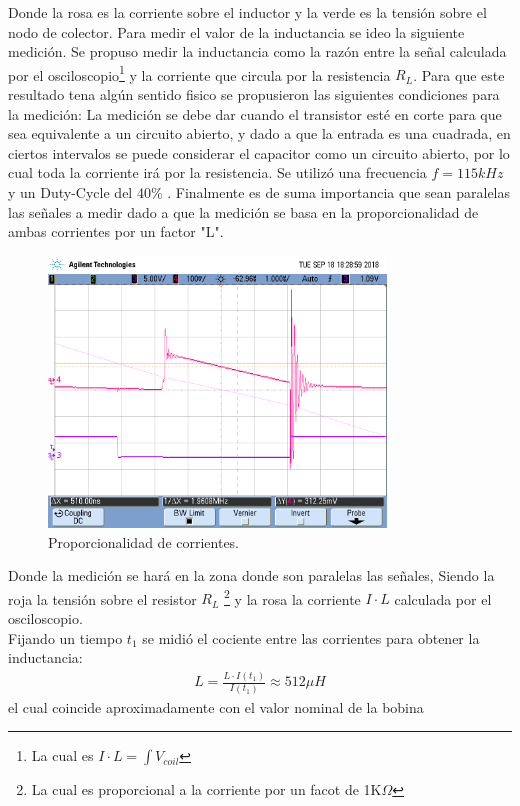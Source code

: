 Donde la rosa es la corriente sobre el inductor y la verde es la tensión sobre el nodo de colector.
Para medir el valor de la inductancia se ideo la siguiente medición.
Se  propuso medir la inductancia como la razón entre la señal calculada por el osciloscopio\footnote{La cual es $I \cdot L = \int{V_{coil}}$} y la corriente que circula por la resistencia $R_L$.
Para que este resultado tena algún sentido fisico se propusieron las siguientes condiciones para la medición:
La medición se debe dar cuando el transistor esté en corte para que sea equivalente a un circuito abierto, y dado a que la entrada es una cuadrada, en ciertos intervalos se puede considerar el capacitor como un circuito abierto, por lo cual toda la corriente irá por la resistencia.
Se utilizó una frecuencia $f= 115kHz$ y un Duty-Cycle del 40\% .
Finalmente es de suma importancia que sean paralelas las señales a medir dado a que la medición se basa en la proporcionalidad de ambas corrientes por un factor "L".
\begin{figure}[H]
	\centering
	\includegraphics[width=0.8\textwidth]{Imagenes/mentira_para_.png}
\caption{Proporcionalidad de corrientes.}
	\label{fig:Lcoil}
\end{figure}
Donde la medición se hará en la zona donde son paralelas las señales, Siendo la roja la tensión sobre el resistor $R_L$ \footnote{La cual es proporcional a la corriente por un facot de 1K$\Omega$} y la rosa la corriente $I\cdot L$ calculada por el osciloscopio.\\
Fijando un tiempo $t_1$ se midió el cociente entre las corrientes para obtener la inductancia:
\begin{align} L = \frac{ L\cdot I(t_1)}{ I ( t_1)}\approx 512 \mu H \end{align}
el cual coincide aproximadamente con el valor nominal de la bobina

